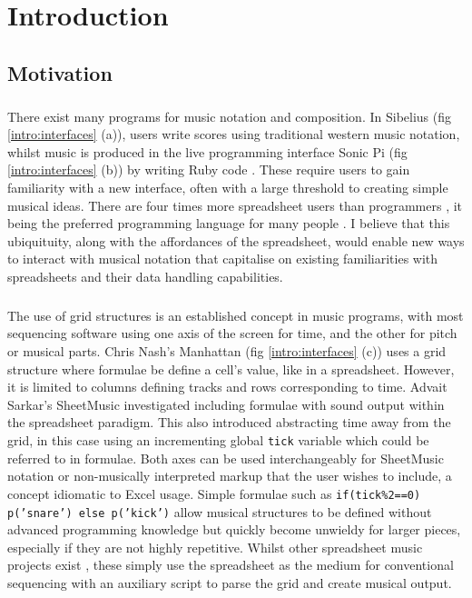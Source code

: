 
\chapter{Introduction}

\section{Motivation}

\paragraph{} There exist many programs for music notation and composition. In Sibelius (fig \ref{intro:interfaces} (a)), users write scores using traditional western music notation, whilst music is produced in the live programming interface Sonic Pi (fig \ref{intro:interfaces} (b)) by writing Ruby code \cite{aaron:pi}. These require users to gain familiarity with a new interface, often with a large threshold to creating simple musical ideas. There are four times more spreadsheet users than programmers \cite{scaffidi:estimating}, it being the preferred programming language for many people \cite{blackwell:functions}. I believe that this ubiquituity, along with the affordances of the spreadsheet, would enable new ways to interact with musical notation that capitalise on existing familiarities with spreadsheets and their data handling capabilities.

\paragraph{} The use of grid structures is an established concept in music programs, with most sequencing software using one axis of the screen for time, and the other for pitch or musical parts. Chris Nash's Manhattan \cite{nash:manhattan} (fig \ref{intro:interfaces} (c)) uses a grid structure where formulae be define a cell's value, like in a spreadsheet. However, it is limited to columns defining tracks and rows corresponding to time. Advait Sarkar's SheetMusic \cite{sarkar:sheetmusic} investigated including formulae with sound output within the spreadsheet paradigm. This also introduced abstracting time away from the grid, in this case using an incrementing global \texttt{tick} variable which could be referred to in formulae. Both axes can be used interchangeably for SheetMusic notation or non-musically interpreted markup that the user wishes to include, a concept idiomatic to Excel usage. Simple formulae such as \texttt{if(tick\%2==0) p('snare') else p('kick')} allow musical structures to be defined without advanced programming knowledge but quickly become unwieldy for larger pieces, especially if they are not highly repetitive. Whilst other spreadsheet music projects exist \cite{hackaday:spreadsheet}, these simply use the spreadsheet as the medium for conventional sequencing with an auxiliary script to parse the grid and create musical output.

